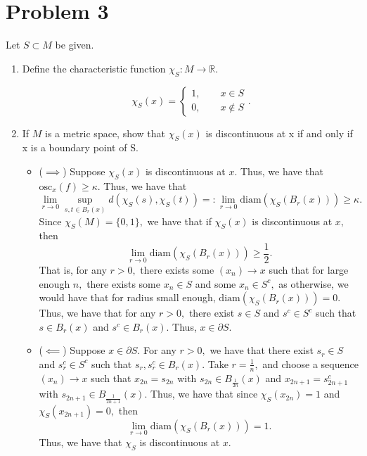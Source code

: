 \documentclass[11pt]{article}
\newcommand{\bbR}{\mathbb{R}}
\newcommand{\osc}{\text{osc}}
\newcommand{\diam}{\text{diam}}
\begin{document}
\section*{Problem 3}
\begin{problem}
    Let $S \subset M$ be given.
\end{problem}
    \begin{enumerate}
        \item 
        \begin{problem}
        Define the characteristic function $\chi_S: M \to \bbR.$
        \end{problem}
        \begin{solution}
            \[\chi_S(x) = 
            \begin{cases}
            1, \qquad x\in S\\
            0, \qquad x \notin S
            \end{cases}.\]
        \end{solution}
        \item 
        \begin{problem}
            If $M$ is a metric space, show that $\chi_S(x)$ is discontinuous at x if and only if x is a boundary point of S.
        \end{problem}
        \begin{solution}
        \begin{itemize}
            \item ($\implies$) Suppose $\chi_S(x)$ is discontinuous at $x.$ Thus, we have that $\osc_x(f) \geq \kappa.$ Thus, we have that 
            \[\lim_{r\to 0}\sup_{s,t \in B_r(x)}d(\chi_S(s), \chi_S(t)) =: \lim_{r\to 0}\diam(\chi_S(B_r(x))) \geq \kappa.\] Since $\chi_S(M) = \{0,1\},$ we have that if $\chi_S(x)$ is discontinuous at $x,$ then 
            \[\lim_{r\to 0}\diam(\chi_S(B_r(x)))\geq \frac{1}{2}.\] That is, for any $r>0,$ there exists some $(x_n)\to x$ such that for large enough $n,$ there exists some $x_n \in S$ and some $x_n \in S^c,$ as otherwise, we would have that for radius small enough, $\diam(\chi_S(B_r(x))) = 0.$ Thus, we have that for any $r>0,$ there exist $s\in S$ and $s^c \in S^c$ such that $s \in B_r(x)$ and $s^c \in B_r(x).$ Thus, $x \in \partial S.$
            \item ($\impliedby$) Suppose $x \in \partial S.$ For any $r>0,$ we have that there exist $s_r\in S$ and $s_r^c \in S^c$ such that $s_r, s_r^c \in B_r(x).$ Take $r = \frac{1}{n},$ and choose a sequence $(x_n) \to x$ such that $x_{2n} = s_{2n}$ with $s_{2n} \in B_{\frac{1}{2n}}(x)$ and $x_{2n + 1} = s_{2n+1}^c$ with $s_{2n+1}\in B_{\frac{1}{2n+1}}(x).$ Thus, we have that since $\chi_S(x_{2n}) = 1$ and $\chi_S(x_{2n+1}) = 0,$ then 
            \[\lim_{r\to 0}\diam(\chi_S(B_r(x))) = 1.\] Thus, we have that $\chi_S$ is discontinuous at $x.$
        \end{itemize}
            
        \end{solution}
    \end{enumerate}
\end{document}
